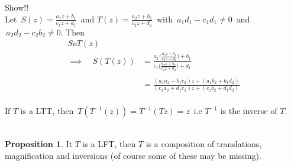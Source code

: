 \documentclass[11pt,a4paper]{article}
\theoremstyle{definition}
\newtheorem{proposition}[thm]{Proposition}
\begin{document}
Show!!\\

Let $\, S(z) = \frac{a_1z + b_1}{c_1z + d_1}\,$ and $T(z) = \frac{a_2z + b_2}{c_2z + d_2}\,$ with $\, a_1d_1 - c_1d_1 \neq 0\,$ and $\, a_2d_2 - c_2b_2\neq 0$. Then 
\begin{align*}
SoT(z) & \\
\implies \quad  S(T(z)) & = \frac{a_1\Bigg(\frac{a_2z + b_2}{c_2z + d_2}\Bigg) + b_1}{c_1\Bigg(\frac{a_2z + b_2}{c_2z + d_2}\Bigg) + d_1}\\\\
& = \frac{(a_1a_2 + b_1c_2)z + (a_1b_2 + b_1d_2)}{(c_1a_2 + d_1c_2)z + (c_1b_2 + d_1d_2)}\\
\end{align*}




If $T$ is a LTT, then $\, T(T^{-1}(z)) = T^{-1}(Tz) = z\,$ i.e $T^{-1}$ is the inverse of $T$.\\\\


\begin{proposition}
It $T$ is a LFT, then $T$ is a composition of translations, magnification and inversions (of course some of these may be missing).
\end{proposition}
\end{document}
